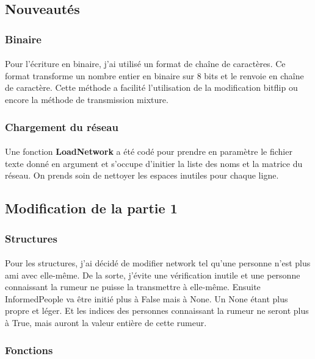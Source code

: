 \documentclass[a4paper,11pt]{article}
\begin{document}
\subsection{Nouveautés}
\subsubsection{Binaire}
\paragraph{}
{Pour l'écriture en binaire, j'ai utilisé un format de chaîne de caractères. Ce format transforme un nombre entier en binaire 
sur 8 bits et le renvoie en chaîne de caractère. Cette méthode a facilité l'utilisation de la modification bitflip ou encore 
la méthode de transmission mixture.}
\subsubsection{Chargement du réseau}
\paragraph{}
{Une fonction \textbf{LoadNetwork} a été codé pour prendre en paramètre le fichier texte donné en argument et 
s'occupe d'initier la liste des noms et la matrice du réseau. On prends soin de nettoyer les espaces inutiles pour chaque 
ligne.}
\subsection{Modification de la partie 1}
\subsubsection{Structures}
\paragraph{}
{Pour les structures, j'ai décidé de modifier network tel qu'une personne n'est plus ami avec elle-même.
De la sorte, j'évite une vérification inutile et une personne connaissant la rumeur ne puisse la transmettre à elle-même.
\newline Ensuite InformedPeople va être initié plus à False mais à None. Un None étant plus propre et léger.
Et les indices des personnes connaissant la rumeur ne seront plus à True, mais auront la valeur entière de cette rumeur.}
\subsubsection{Fonctions}
\end{document}
